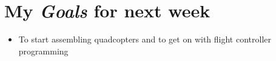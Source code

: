 \section{My \emph{Goals} for next week}

\begin{itemize}
\item To start assembling quadcopters and to get on with flight controller programming 
\end{itemize}










